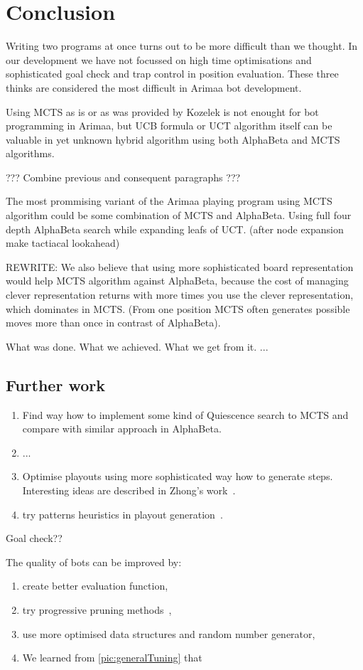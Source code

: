 \chapter{Conclusion}
Writing two programs at once turns out to be more difficult than we thought. In
our development we have not focussed on high time optimisations and
sophisticated goal check and trap control in position evaluation. These three
thinks are considered the most difficult in Arimaa bot development.

Using MCTS as is or as was provided by Kozelek is not enought for bot
programming in Arimaa, but UCB formula or UCT algorithm itself can be valuable
in yet unknown hybrid algorithm using both AlphaBeta and MCTS algorithms.

??? Combine previous and consequent paragraphs ???

The most prommising variant of the Arimaa playing program using MCTS algorithm
could be some combination of MCTS and AlphaBeta. Using full four depth
AlphaBeta search while expanding leafs of UCT. (after node expansion make
tactiacal lookahead)

REWRITE: We also believe that using more sophisticated board representation
would help MCTS algorithm against AlphaBeta, because the cost of managing
clever representation returns with more times you use the clever
representation, which dominates in MCTS. (From one position MCTS often
generates possible moves more than once in contrast of AlphaBeta).

What was done. What we achieved. What we get from it. ...

\section{Further work}

\begin{enumerate}
\item Find way how to implement some kind of Quiescence search to MCTS and compare with similar approach in AlphaBeta.
\item ...
\item Optimise playouts using more sophisticated way how to generate steps. Interesting ideas are described in Zhong's work~\cite{ZHONG}.
\item try patterns heuristics in playout generation~\cite{PatternsGo,PatternsArimaa}.
\end{enumerate}
Goal check??

The quality of bots can be improved by:
\begin{enumerate}
\item create better evaluation function,
\item try progressive pruning  methods~\cite{progressive-strategies,
MonteCarloGo},
\item use more optimised data structures and random number generator,
\item We learned from \ref{pic:generalTuning} that 
\end{enumerate}
